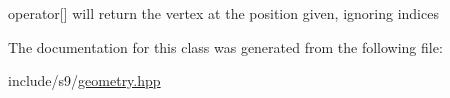 operator\mbox{[}\mbox{]} will return the vertex at the position given, ignoring indices 

The documentation for this class was generated from the following file\-:\begin{DoxyCompactItemize}
\item 
include/s9/\hyperlink{geometry_8hpp}{geometry.\-hpp}\end{DoxyCompactItemize}
